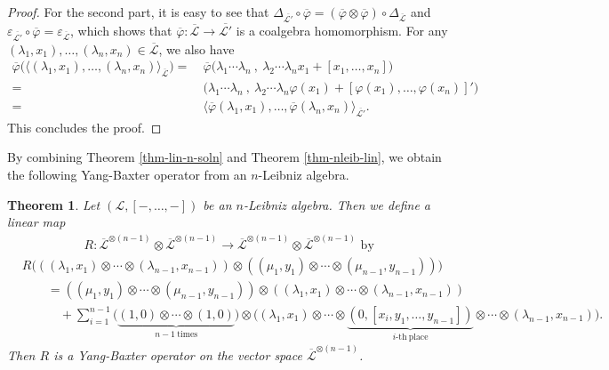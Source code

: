 \documentclass[a4paper,reqno,10pt]{amsart}
\theoremstyle{plain}
\newtheorem{thm}{Theorem}[section]
\theoremstyle{definition}
\theoremstyle{remark}
\begin{document}
\begin{proof}
     For the second part, it is easy to see that $\Delta_{ \overline{ \mathcal{L}'}} \circ \overline{\varphi} = (\overline{\varphi} \otimes \overline{\varphi}) \circ \Delta_{ \overline{ \mathcal{L}}}$ and $\varepsilon_{ \overline{ \mathcal{L}'}} \circ \overline{\varphi} = \varepsilon_{\overline{ \mathcal{L}}}$, which shows that $\overline{ \varphi}: \overline{ \mathcal{L}} \rightarrow \overline{ \mathcal{L}'}$ is a coalgebra homomorphism. For any $(\lambda_1, x_1), \ldots, (\lambda_n, x_n) \in \overline{ \mathcal{L}}$, we also have
     \begin{align*}
         \overline{\varphi} \big(  \langle (\lambda_1, x_1), \ldots, (\lambda_n, x_n) \rangle_{\overline{ \mathcal{L}}}   \big) =~& \overline{\varphi} \big( \lambda_1 \cdots \lambda_n ~\!, ~\! \lambda_2 \cdots \lambda_n x_1 + [x_1, \ldots, x_n]    \big) \\
         =~&  \big( \lambda_1 \cdots \lambda_n ~\!, ~\! \lambda_2 \cdots \lambda_n \varphi (x_1) + [\varphi(x_1), \ldots, \varphi( x_n)]'   \big) \\
         =~& \langle  \overline{\varphi} (\lambda_1, x_1) , \ldots,   \overline{\varphi} (\lambda_n, x_n) \rangle_{\overline{ \mathcal{L}'}}.
     \end{align*}
     This concludes the proof.
\end{proof}

By combining Theorem \ref{thm-lin-n-soln} and Theorem  \ref{thm-nleib-lin}, we obtain the following Yang-Baxter operator from an $n$-Leibniz algebra.

\begin{thm}
    Let $(\mathcal{L}, [-, \ldots, -])$ be an $n$-Leibniz algebra. Then we define a linear map 
    \begin{align*}
    R : \overline{\mathcal{L}}^{\otimes (n-1)} \otimes \overline{\mathcal{L}}^{\otimes (n-1)} \rightarrow \overline{\mathcal{L}}^{\otimes (n-1)} \otimes \overline{\mathcal{L}}^{\otimes (n-1)}  \text{ by }
    \end{align*}
    \begin{align*}
        &R  \big(  ( (\lambda_1, x_1) \otimes \cdots \otimes (\lambda_{n-1}, x_{n-1}) )  \otimes   ( (\mu_1, y_1) \otimes \cdots \otimes (\mu_{n-1}, y_{n-1}) )  \big) \\
        & \qquad =  ( (\mu_1, y_1) \otimes \cdots \otimes (\mu_{n-1}, y_{n-1}) ) \otimes  ( (\lambda_1, x_1) \otimes \cdots \otimes (\lambda_{n-1}, x_{n-1}) ) \\
        & \quad \qquad + \sum_{i=1}^{n-1} \big( \underbrace{ (1, 0) \otimes \cdots \otimes (1, 0)}_{n-1 \mathrm{~ times}} \big) \otimes \big(  (\lambda_1, x_1) \otimes \cdots \otimes \underbrace{ (0, [x_i, y_1, \ldots, y_{n-1}])}_{i\text{-}\mathrm{th~ place}} \otimes \cdots \otimes (\lambda_{n-1}, x_{n-1}) \big).
    \end{align*}
    Then $R$ is a Yang-Baxter operator on the vector space $\overline{\mathcal{L}}^{\otimes (n-1)}$.
\end{thm}
\end{document}
